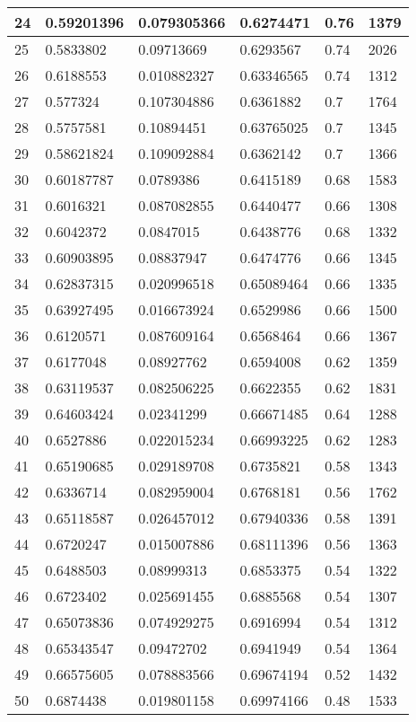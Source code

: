 \begin{longtable}{|l|l|l|l|l|l|}
24 & 0.59201396 & 0.079305366 & 0.6274471 & 0.76 & 1379 \\ \hline 
25 & 0.5833802 & 0.09713669 & 0.6293567 & 0.74 & 2026 \\ \hline 
26 & 0.6188553 & 0.010882327 & 0.63346565 & 0.74 & 1312 \\ \hline 
27 & 0.577324 & 0.107304886 & 0.6361882 & 0.7 & 1764 \\ \hline 
28 & 0.5757581 & 0.10894451 & 0.63765025 & 0.7 & 1345 \\ \hline 
29 & 0.58621824 & 0.109092884 & 0.6362142 & 0.7 & 1366 \\ \hline 
30 & 0.60187787 & 0.0789386 & 0.6415189 & 0.68 & 1583 \\ \hline 
31 & 0.6016321 & 0.087082855 & 0.6440477 & 0.66 & 1308 \\ \hline 
32 & 0.6042372 & 0.0847015 & 0.6438776 & 0.68 & 1332 \\ \hline 
33 & 0.60903895 & 0.08837947 & 0.6474776 & 0.66 & 1345 \\ \hline 
34 & 0.62837315 & 0.020996518 & 0.65089464 & 0.66 & 1335 \\ \hline 
35 & 0.63927495 & 0.016673924 & 0.6529986 & 0.66 & 1500 \\ \hline 
36 & 0.6120571 & 0.087609164 & 0.6568464 & 0.66 & 1367 \\ \hline 
37 & 0.6177048 & 0.08927762 & 0.6594008 & 0.62 & 1359 \\ \hline 
38 & 0.63119537 & 0.082506225 & 0.6622355 & 0.62 & 1831 \\ \hline 
39 & 0.64603424 & 0.02341299 & 0.66671485 & 0.64 & 1288 \\ \hline 
40 & 0.6527886 & 0.022015234 & 0.66993225 & 0.62 & 1283 \\ \hline 
41 & 0.65190685 & 0.029189708 & 0.6735821 & 0.58 & 1343 \\ \hline 
42 & 0.6336714 & 0.082959004 & 0.6768181 & 0.56 & 1762 \\ \hline 
43 & 0.65118587 & 0.026457012 & 0.67940336 & 0.58 & 1391 \\ \hline 
44 & 0.6720247 & 0.015007886 & 0.68111396 & 0.56 & 1363 \\ \hline 
45 & 0.6488503 & 0.08999313 & 0.6853375 & 0.54 & 1322 \\ \hline 
46 & 0.6723402 & 0.025691455 & 0.6885568 & 0.54 & 1307 \\ \hline 
47 & 0.65073836 & 0.074929275 & 0.6916994 & 0.54 & 1312 \\ \hline 
48 & 0.65343547 & 0.09472702 & 0.6941949 & 0.54 & 1364 \\ \hline 
49 & 0.66575605 & 0.078883566 & 0.69674194 & 0.52 & 1432 \\ \hline 
50 & 0.6874438 & 0.019801158 & 0.69974166 & 0.48 & 1533 \\ \hline 
\end{longtable}